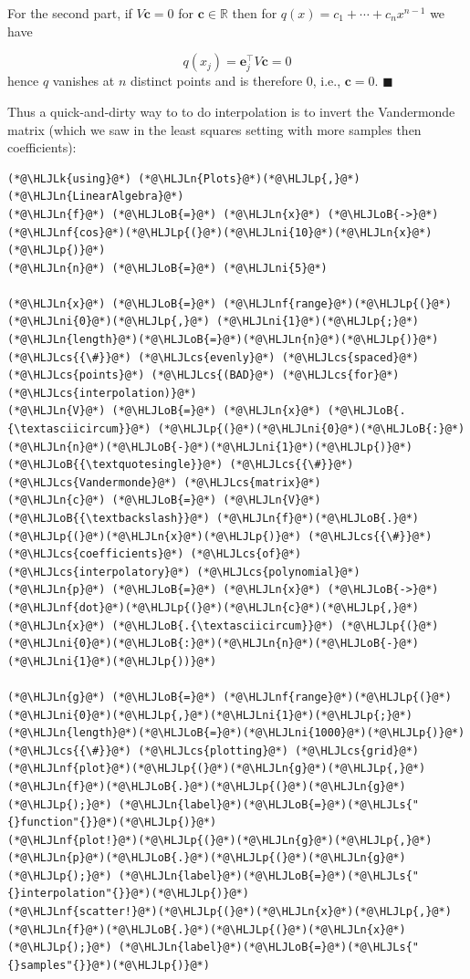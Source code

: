 \documentclass[12pt,a4paper]{article}
\newcommand{\HLJLk}[1]{\textcolor[RGB]{148,91,176}{\textbf{#1}}}
\newcommand{\HLJLn}[1]{#1}
\newcommand{\HLJLnf}[1]{\textcolor[RGB]{66,102,213}{#1}}
\newcommand{\HLJLs}[1]{\textcolor[RGB]{201,61,57}{#1}}
\newcommand{\HLJLni}[1]{\textcolor[RGB]{59,151,46}{#1}}
\newcommand{\HLJLoB}[1]{\textcolor[RGB]{102,102,102}{\textbf{#1}}}
\newcommand{\HLJLp}[1]{#1}
\newcommand{\HLJLcs}[1]{\textcolor[RGB]{153,153,119}{\textit{#1}}}
\def\bbR{ {\mathbb R} }
\begin{document}
For the second part, if $V \mathbf{c} = 0$ for $\mathbf{c} \ensuremath{\in} \ensuremath{\bbR}$ then for $q(x) = c_1 + \ensuremath{\cdots} + c_n x^{n-1}$ we have

\[
q(x_j) = \mathbf{e}_j^\ensuremath{\top} V \mathbf{c} = 0
\]
hence $q$ vanishes at $n$ distinct points and is therefore 0, i.e., $\mathbf{c} = 0$. $\blacksquare$

Thus a quick-and-dirty way to to do interpolation is to invert the Vandermonde matrix (which we saw in the least squares setting with more samples then coefficients):


\begin{lstlisting}
(*@\HLJLk{using}@*) (*@\HLJLn{Plots}@*)(*@\HLJLp{,}@*) (*@\HLJLn{LinearAlgebra}@*)
(*@\HLJLn{f}@*) (*@\HLJLoB{=}@*) (*@\HLJLn{x}@*) (*@\HLJLoB{->}@*) (*@\HLJLnf{cos}@*)(*@\HLJLp{(}@*)(*@\HLJLni{10}@*)(*@\HLJLn{x}@*)(*@\HLJLp{)}@*)
(*@\HLJLn{n}@*) (*@\HLJLoB{=}@*) (*@\HLJLni{5}@*)

(*@\HLJLn{x}@*) (*@\HLJLoB{=}@*) (*@\HLJLnf{range}@*)(*@\HLJLp{(}@*)(*@\HLJLni{0}@*)(*@\HLJLp{,}@*) (*@\HLJLni{1}@*)(*@\HLJLp{;}@*) (*@\HLJLn{length}@*)(*@\HLJLoB{=}@*)(*@\HLJLn{n}@*)(*@\HLJLp{)}@*)(*@\HLJLcs{{\#}}@*) (*@\HLJLcs{evenly}@*) (*@\HLJLcs{spaced}@*) (*@\HLJLcs{points}@*) (*@\HLJLcs{(BAD}@*) (*@\HLJLcs{for}@*) (*@\HLJLcs{interpolation)}@*)
(*@\HLJLn{V}@*) (*@\HLJLoB{=}@*) (*@\HLJLn{x}@*) (*@\HLJLoB{.{\textasciicircum}}@*) (*@\HLJLp{(}@*)(*@\HLJLni{0}@*)(*@\HLJLoB{:}@*)(*@\HLJLn{n}@*)(*@\HLJLoB{-}@*)(*@\HLJLni{1}@*)(*@\HLJLp{)}@*)(*@\HLJLoB{{\textquotesingle}}@*) (*@\HLJLcs{{\#}}@*) (*@\HLJLcs{Vandermonde}@*) (*@\HLJLcs{matrix}@*)
(*@\HLJLn{c}@*) (*@\HLJLoB{=}@*) (*@\HLJLn{V}@*) (*@\HLJLoB{{\textbackslash}}@*) (*@\HLJLn{f}@*)(*@\HLJLoB{.}@*)(*@\HLJLp{(}@*)(*@\HLJLn{x}@*)(*@\HLJLp{)}@*) (*@\HLJLcs{{\#}}@*) (*@\HLJLcs{coefficients}@*) (*@\HLJLcs{of}@*) (*@\HLJLcs{interpolatory}@*) (*@\HLJLcs{polynomial}@*)
(*@\HLJLn{p}@*) (*@\HLJLoB{=}@*) (*@\HLJLn{x}@*) (*@\HLJLoB{->}@*) (*@\HLJLnf{dot}@*)(*@\HLJLp{(}@*)(*@\HLJLn{c}@*)(*@\HLJLp{,}@*) (*@\HLJLn{x}@*) (*@\HLJLoB{.{\textasciicircum}}@*) (*@\HLJLp{(}@*)(*@\HLJLni{0}@*)(*@\HLJLoB{:}@*)(*@\HLJLn{n}@*)(*@\HLJLoB{-}@*)(*@\HLJLni{1}@*)(*@\HLJLp{))}@*)

(*@\HLJLn{g}@*) (*@\HLJLoB{=}@*) (*@\HLJLnf{range}@*)(*@\HLJLp{(}@*)(*@\HLJLni{0}@*)(*@\HLJLp{,}@*)(*@\HLJLni{1}@*)(*@\HLJLp{;}@*) (*@\HLJLn{length}@*)(*@\HLJLoB{=}@*)(*@\HLJLni{1000}@*)(*@\HLJLp{)}@*) (*@\HLJLcs{{\#}}@*) (*@\HLJLcs{plotting}@*) (*@\HLJLcs{grid}@*)
(*@\HLJLnf{plot}@*)(*@\HLJLp{(}@*)(*@\HLJLn{g}@*)(*@\HLJLp{,}@*) (*@\HLJLn{f}@*)(*@\HLJLoB{.}@*)(*@\HLJLp{(}@*)(*@\HLJLn{g}@*)(*@\HLJLp{);}@*) (*@\HLJLn{label}@*)(*@\HLJLoB{=}@*)(*@\HLJLs{"{}function"{}}@*)(*@\HLJLp{)}@*)
(*@\HLJLnf{plot!}@*)(*@\HLJLp{(}@*)(*@\HLJLn{g}@*)(*@\HLJLp{,}@*) (*@\HLJLn{p}@*)(*@\HLJLoB{.}@*)(*@\HLJLp{(}@*)(*@\HLJLn{g}@*)(*@\HLJLp{);}@*) (*@\HLJLn{label}@*)(*@\HLJLoB{=}@*)(*@\HLJLs{"{}interpolation"{}}@*)(*@\HLJLp{)}@*)
(*@\HLJLnf{scatter!}@*)(*@\HLJLp{(}@*)(*@\HLJLn{x}@*)(*@\HLJLp{,}@*) (*@\HLJLn{f}@*)(*@\HLJLoB{.}@*)(*@\HLJLp{(}@*)(*@\HLJLn{x}@*)(*@\HLJLp{);}@*) (*@\HLJLn{label}@*)(*@\HLJLoB{=}@*)(*@\HLJLs{"{}samples"{}}@*)(*@\HLJLp{)}@*)
\end{lstlisting}
\end{document}
